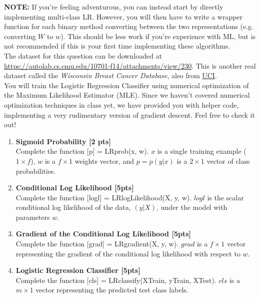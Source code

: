\textbf{NOTE:} If you're feeling adventurous, you can instead start by directly implementing multi-class LR. However, you will then have to write a wrapper function for each binary method converting between the two representations (e.g. converting $W$ to $w$). This should be less work if you're experience with ML, but is not recommended if this is your first time implementing these algorithms. \\

The dataset for this question can be downloaded at \url{https://autolab.cs.cmu.edu/10701-f14/attachments/view/230}. This is another real dataset called the \textit{Wisconsin Breast Cancer Database}, also from \href{http://archive.ics.uci.edu/ml/datasets/Breast+Cancer+Wisconsin+%28Original%29}{UCI}. \\

You will train the Logistic Regression Classifier using numerical optimization of the Maximum Likelihood Estimator (MLE). Since we haven't covered numerical optimization techniques in class yet, we have provided you with helper code, implementing a very rudimentary version of gradient descent. Feel free to check it out! 


\begin{enumerate}
\item \textbf{Sigmoid Probability [2 pts]}\\
Complete the function \textsf{[p] = LRprob(x, w)}. $x$ is a single training example ($1 \times f$), $w$ is a $f \times 1$ weights vector, and $p = p(y|x)$ is a $2 \times 1$ vector of class probabilities.

\item \textbf{Conditional Log Likelihood [5pts]}\\
Complete the function \textsf{[logl] = LRlogLikelihood(X, y, w)}. $logl$ is the scalar conditional log likelihood of the data, $(y|X)$, under the model with parameters $w$.

\item \textbf{Gradient of the Conditional Log Likelihood [5pts]}\\
Complete the function \textsf{[grad] = LRgradient(X, y, w)}. $grad$ is a $f \times 1$ vector representing the gradient of the conditional log likelihood with respect to $w$. 

\item \textbf{Logistic Regression Classifier [5pts]}\\
Complete the function \textsf{[cls] = LRclassify(XTrain, yTrain, XTest)}. $cls$ is a $m \times 1$ vector representing the predicted test class labels. 
\end{enumerate}


